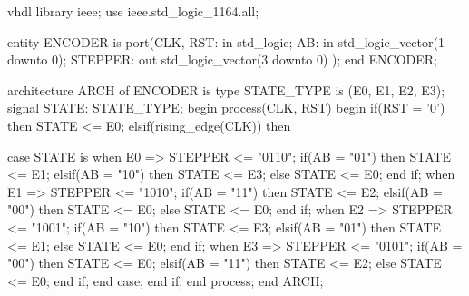 \begin{code}{vhdl}
library ieee;
use ieee.std_logic_1164.all;

entity ENCODER is
  port(CLK, RST: in std_logic;
    AB: in std_logic_vector(1 downto 0);
      STEPPER: out std_logic_vector(3 downto 0)
      );
end ENCODER;

architecture ARCH of ENCODER is
   type STATE_TYPE is (E0, E1, E2, E3);
   signal STATE: STATE_TYPE;
   begin
      process(CLK, RST)
         begin
            if(RST = '0') then STATE <= E0; 
               elsif(rising_edge(CLK)) then

                  case STATE is
                     when E0 => STEPPER <= "0110";
                        if(AB = "01") then STATE <= E1;
                           elsif(AB = "10") then STATE <= E3;
                              else STATE <= E0;
                        end if;
                     when E1 => STEPPER <= "1010";
                        if(AB = "11") then STATE <= E2;
                           elsif(AB = "00") then STATE <= E0;
                              else STATE <= E0;
                        end if;
                     when E2 => STEPPER <= "1001";
                        if(AB = "10") then STATE <= E3;
                           elsif(AB = "01") then STATE <= E1;
                              else STATE <= E0;
                        end if;
                     when E3 => STEPPER <= "0101";
                        if(AB = "00") then STATE <= E0;
                           elsif(AB = "11") then STATE <= E2;
                              else STATE <= E0;
                        end if;
                  end case;
            end if;
      end process;
end ARCH;
\end{code}

